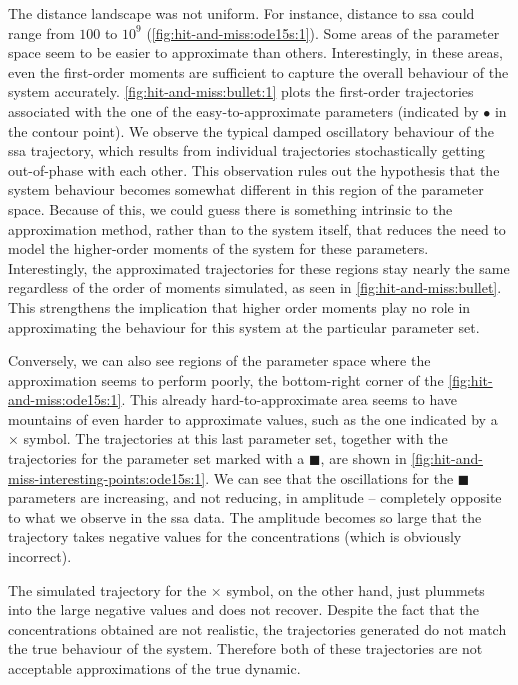 The distance landscape was not uniform. For instance, distance to \gls{ssa} could range from $100$ to $10^9$ (\autoref{fig:hit-and-miss:ode15s:1}).
Some areas of the parameter space seem to be easier to approximate than others.
Interestingly, in these areas, even the first-order moments are sufficient to capture the overall behaviour of the system accurately.
\autoref{fig:hit-and-miss:bullet:1} plots the first-order trajectories associated with the one of the easy-to-approximate parameters (indicated by $\bullet$ in the contour point).
We observe the typical damped oscillatory behaviour of the \gls{ssa} trajectory,
which results from individual trajectories stochastically getting out-of-phase with each other\cite{ale_general_2013}.
This observation rules out the hypothesis that the system behaviour becomes somewhat different in this region of the parameter space. 
Because of this, we could guess there is something intrinsic to the approximation method, rather than to the system itself, that reduces the need to model the higher-order moments of the system for these parameters. 
Interestingly, the approximated trajectories for these regions stay nearly the same regardless of the order of moments simulated, as seen in \autoref{fig:hit-and-miss:bullet}. 
This strengthens the implication that higher order moments play no role in approximating the behaviour for this system at the particular parameter set.

Conversely, we can also see regions of the parameter space where the approximation seems to perform poorly,
\ie{} the bottom-right corner of the \autoref{fig:hit-and-miss:ode15s:1}.
This already hard-to-approximate area seems to have mountains of even harder to approximate values, such as the one indicated by a $\times$ symbol.
The trajectories at this last parameter set, together with the trajectories for the parameter set marked with a $\blacksquare$, are shown in \autoref{fig:hit-and-miss-interesting-points:ode15s:1}.
We can see that the oscillations for the $\blacksquare$ parameters are increasing, and not reducing, in amplitude -- completely opposite to what we observe in the \gls{ssa} data.
The amplitude becomes so large that the trajectory takes negative values for the concentrations (which is obviously incorrect).
 
The simulated trajectory for the $\times$ symbol, on the other hand, just plummets into the large negative values and does not recover.
Despite the fact that the concentrations obtained are not realistic, the trajectories generated do not match the true behaviour of the system.
Therefore both of these trajectories are not acceptable approximations of the true dynamic.


